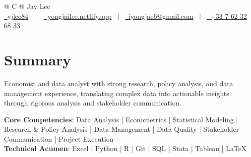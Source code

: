 \documentclass[a4paper,12pt]{article}
\begin{document}
\pagestyle{empty} 



\begin{tabularx}{\linewidth}{@{} C @{}}
\Huge{Jay Lee} \\[7.5pt]
\href{https://github.com/yjlee84}{\raisebox{-0.05\height}\faGithub\ yjlee84} \ $|$ \ 
\href{https://yongjailee.netlify.app}{\raisebox{-0.05\height}\faGlobe \ yongjailee.netlify.app} \ $|$ \ 
\href{mailto:email@mysite.com}{\raisebox{-0.05\height}\faEnvelope \ iyongjae6@gmail.com} \ $|$ \ 
\href{tel:+000000000000}{\raisebox{-0.05\height}\faMobile \ +33 7 62 32 68 33} \\
\end{tabularx}


\section{Summary}
Economist and data analyst with strong research, policy analysis, and data management experience, translating complex data into actionable insights through rigorous analysis and stakeholder communication.

\textbf{Core Competencies}: Data Analysis | Econometrics | Statistical Modeling | Research \& Policy Analysis | Data Management | Data Quality | Stakeholder Communication | Project Execution\\
\textbf{Technical Acumen}: Excel | Python | R | Git | SQL | Stata | Tableau | \LaTeX{}
\end{document}
